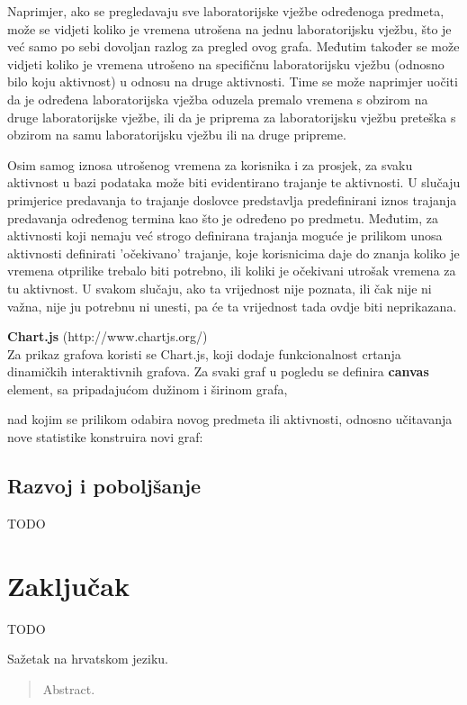 \documentclass[times, utf8, zavrsni]{fer}
\begin{document}
Naprimjer, ako se pregledavaju sve laboratorijske vježbe određenoga predmeta, može se vidjeti koliko je vremena utrošena na jednu laboratorijsku vježbu, što je već samo po sebi dovoljan razlog za pregled ovog grafa. Međutim također se može vidjeti koliko je vremena utrošeno na specifičnu laboratorijsku vježbu (odnosno bilo koju aktivnost) u odnosu na druge aktivnosti. Time se može naprimjer uočiti da je određena laboratorijska vježba oduzela premalo vremena s obzirom na druge laboratorijske vježbe, ili da je priprema za laboratorijsku vježbu preteška s obzirom na samu laboratorijsku vježbu ili na druge pripreme.

Osim samog iznosa utrošenog vremena za korisnika i za prosjek, za svaku aktivnost u bazi podataka može biti evidentirano trajanje te aktivnosti. U slučaju primjerice predavanja to trajanje doslovce predstavlja predefinirani iznos trajanja predavanja određenog termina kao što je određeno po predmetu. Međutim, za aktivnosti koji nemaju već strogo definirana trajanja moguće je prilikom unosa aktivnosti definirati 'očekivano' trajanje, koje korisnicima daje do znanja koliko je vremena otprilike trebalo biti potrebno, ili koliki je očekivani utrošak vremena za tu aktivnost. U svakom slučaju, ako ta vrijednost nije poznata, ili čak nije ni važna, nije ju potrebnu ni unesti, pa će ta vrijednost tada ovdje biti neprikazana.

\textbf{Chart.js} (http://www.chartjs.org/)\\
Za prikaz grafova koristi se Chart.js, koji dodaje funkcionalnost crtanja dinamičkih interaktivnih grafova. Za svaki graf u pogledu se definira \textbf{canvas} element, sa pripadajućom dužinom i širinom grafa,

\lstset{style=html}


nad kojim se prilikom odabira novog predmeta ili aktivnosti, odnosno učitavanja nove statistike konstruira novi graf:

\lstset{style=js}


\section{Razvoj i poboljšanje}
TODO

\chapter{Zaključak}
TODO




\begin{sazetak}
Sažetak na hrvatskom jeziku.

\end{sazetak}

\begin{abstract}
Abstract.

\end{abstract}
\end{document}
